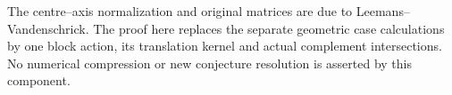 \documentclass[11pt]{article}
\begin{document}
The centre--axis normalization and original matrices are due to
Leemans--Vandenschrick. The proof here replaces the separate geometric
case calculations by one block action, its translation kernel and
actual complement intersections. No numerical compression or new
conjecture resolution is asserted by this component.
\end{document}
